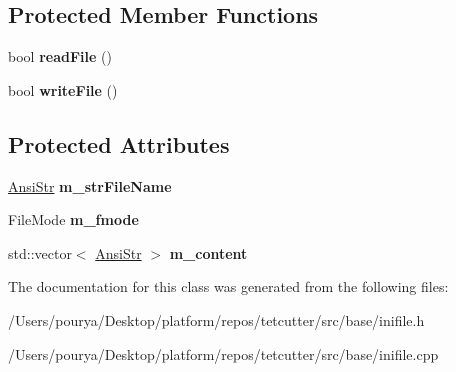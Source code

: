 \subsection*{Protected Member Functions}
\begin{DoxyCompactItemize}
\item 
\hypertarget{classps_1_1utils_1_1IniFile_a6c15e81582f02519149d37d72b542823}{}bool {\bfseries read\+File} ()\label{classps_1_1utils_1_1IniFile_a6c15e81582f02519149d37d72b542823}

\item 
\hypertarget{classps_1_1utils_1_1IniFile_a69b8632d32012766c252cf9a631a98fd}{}bool {\bfseries write\+File} ()\label{classps_1_1utils_1_1IniFile_a69b8632d32012766c252cf9a631a98fd}

\end{DoxyCompactItemize}
\subsection*{Protected Attributes}
\begin{DoxyCompactItemize}
\item 
\hypertarget{classps_1_1utils_1_1IniFile_a2f957d0c331b6aadeada134d2bdfc9d1}{}\hyperlink{classps_1_1base_1_1CAString}{Ansi\+Str} {\bfseries m\+\_\+str\+File\+Name}\label{classps_1_1utils_1_1IniFile_a2f957d0c331b6aadeada134d2bdfc9d1}

\item 
\hypertarget{classps_1_1utils_1_1IniFile_a92b9cd3e5172fb4e200b36cc4eb9d454}{}File\+Mode {\bfseries m\+\_\+fmode}\label{classps_1_1utils_1_1IniFile_a92b9cd3e5172fb4e200b36cc4eb9d454}

\item 
\hypertarget{classps_1_1utils_1_1IniFile_a8d9ecf2d3996d484016e3e44f5715a4e}{}std\+::vector$<$ \hyperlink{classps_1_1base_1_1CAString}{Ansi\+Str} $>$ {\bfseries m\+\_\+content}\label{classps_1_1utils_1_1IniFile_a8d9ecf2d3996d484016e3e44f5715a4e}

\end{DoxyCompactItemize}


The documentation for this class was generated from the following files\+:\begin{DoxyCompactItemize}
\item 
/\+Users/pourya/\+Desktop/platform/repos/tetcutter/src/base/inifile.\+h\item 
/\+Users/pourya/\+Desktop/platform/repos/tetcutter/src/base/inifile.\+cpp\end{DoxyCompactItemize}
